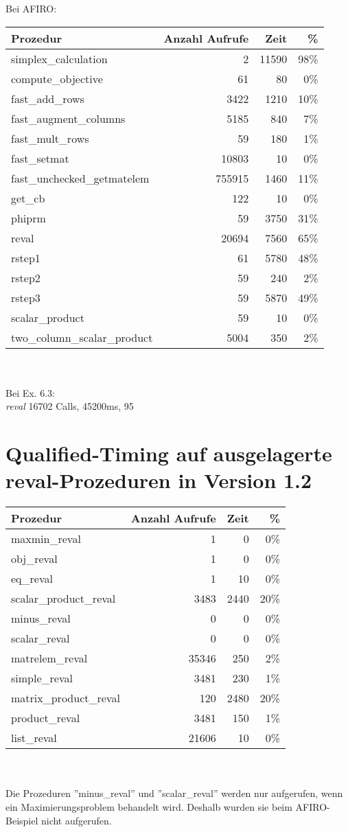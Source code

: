 \documentclass[a4paper]{article}
\begin{document}
Bei AFIRO: 
\\
\begin{tabular}{lrrr}
Prozedur & Anzahl Aufrufe & Zeit & \% \\
\hline
simplex\_calculation & 2 & 11590 & 98\% \\
compute\_objective & 61 & 80 & 0\% \\
fast\_add\_rows & 3422 & 1210 & 10\% \\ 
fast\_augment\_columns & 5185 & 840 & 7\% \\
fast\_mult\_rows & 59 & 180 & 1\% \\ 
fast\_setmat & 10803 & 10 & 0\% \\
fast\_unchecked\_getmatelem & 755915 & 1460 & 11\% \\
get\_cb & 122 & 10 & 0\% \\
phiprm & 59 & 3750 & 31\% \\
reval & 20694 & 7560 & 65\% \\
rstep1 & 61 & 5780 & 48\% \\
rstep2 & 59 & 240 & 2\% \\
rstep3 & 59 & 5870 & 49\% \\
scalar\_product & 59 & 10 & 0\% \\
two\_column\_scalar\_product & 5004 & 350 & 2\% \\
\end{tabular}
\\
\\
Bei Ex. 6.3:
\\
\textit{reval} 16702 Calls, 45200ms, 95%

\section{Qualified-Timing auf ausgelagerte reval-Prozeduren in Version 1.2}

\begin{tabular}{lrrr}
Prozedur & Anzahl Aufrufe & Zeit & \% \\
\hline
maxmin\_reval & 1 & 0 & 0\% \\
obj\_reval & 1 & 0 & 0\% \\
eq\_reval & 1 & 10 & 0\% \\
scalar\_product\_reval & 3483 & 2440 & 20\% \\
minus\_reval & 0 & 0 & 0\% \\
scalar\_reval & 0 & 0 & 0\% \\
matrelem\_reval & 35346 & 250 & 2\% \\
simple\_reval & 3481 & 230 & 1\% \\
matrix\_product\_reval & 120 & 2480 & 20\% \\
product\_reval & 3481 & 150 & 1\% \\
list\_reval & 21606 & 10 & 0\% \\
\end{tabular} \\
\\
Die Prozeduren ''minus\_reval'' und ''scalar\_reval'' werden nur aufgerufen, wenn ein Maximierungsproblem behandelt wird. Deshalb wurden sie beim AFIRO-Beispiel nicht aufgerufen.
\end{document}
